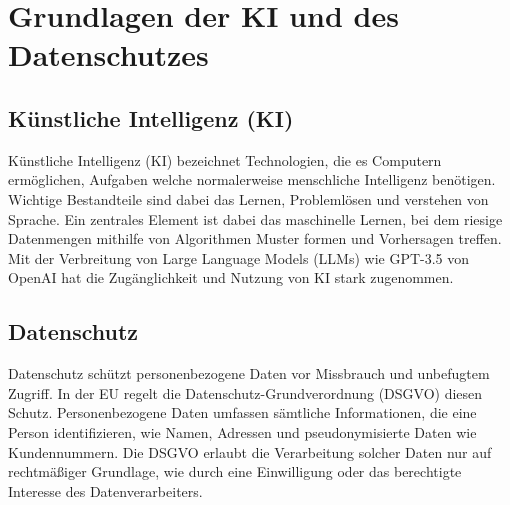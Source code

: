 \chapter{Grundlagen der KI und des Datenschutzes}

\section{Künstliche Intelligenz (KI)}

Künstliche Intelligenz (KI) bezeichnet Technologien, die es Computern
ermöglichen, Aufgaben welche normalerweise menschliche Intelligenz benötigen.
Wichtige Bestandteile sind dabei das Lernen, Problemlösen und verstehen von
Sprache. Ein zentrales Element ist dabei das maschinelle Lernen, bei dem riesige
Datenmengen mithilfe von Algorithmen Muster formen und Vorhersagen treffen. 
Mit der Verbreitung von Large Language Models (LLMs) wie GPT-3.5 von OpenAI hat
die Zugänglichkeit und Nutzung von KI stark zugenommen. 
\cite{haerting2024}


\section{Datenschutz}

Datenschutz schützt personenbezogene Daten vor Missbrauch und unbefugtem
Zugriff. In der EU regelt die Datenschutz-Grundverordnung (DSGVO) diesen Schutz.
Personenbezogene Daten umfassen sämtliche Informationen, die eine Person identifizieren,
wie Namen, Adressen und pseudonymisierte Daten wie Kundennummern. Die DSGVO erlaubt
die Verarbeitung solcher Daten nur auf rechtmäßiger Grundlage, wie
durch eine Einwilligung oder das berechtigte Interesse des Datenverarbeiters.

\cite{haerting2024}
